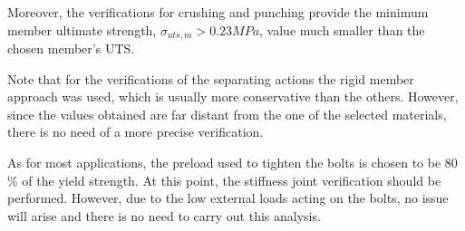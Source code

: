 Moreover, the verifications for crushing and punching provide the minimum member ultimate strength, $\sigma_{uts,m} > 0.23 MPa$, value much smaller than the chosen member's UTS.

Note that for the verifications of the separating actions the rigid member approach was used, which is usually more conservative than the others. However, since the values obtained are far distant from the one of the selected materials, there is no need of a more precise verification.

As for most applications, the preload used to tighten the bolts is chosen to be 80$\%$ of the yield strength. At this point, the stiffness joint verification should be performed. However, due to the low external loads acting on the bolts, no issue will arise and there is no need to carry out this analysis. 